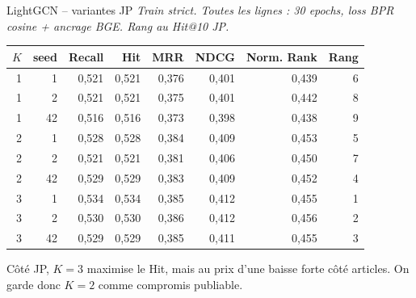 \documentclass[aspectratio=169,10pt]{beamer}
\newcommand{\keybox}[1]{%
  \begin{center}
  \colorbox{accentsoft}{\parbox{0.92\linewidth}{\centering #1}}
  \end{center}}
\begin{document}
\begin{frame}{LightGCN -- variantes JP}
  \scriptsize
  \textit{Train strict. Toutes les lignes : 30 epochs, loss BPR cosine + ancrage BGE. Rang au Hit@10 JP.}

  \vspace{0.25em}
  \begin{center}
  \renewcommand{\arraystretch}{1.08}
  \setlength{\tabcolsep}{4pt}
  \begin{tabular}{@{}r r r r r r r r@{}}
    \toprule
    $K$ & seed & Recall & Hit & MRR & NDCG & Norm. Rank & Rang \\
    \midrule
    1 & 1 & 0,521 & 0,521 & 0,376 & 0,401 & 0,439 & 6 \\
    1 & 2 & 0,521 & 0,521 & 0,375 & 0,401 & 0,442 & 8 \\
    1 & 42 & 0,516 & 0,516 & 0,373 & 0,398 & 0,438 & 9 \\
    2 & 1 & 0,528 & 0,528 & 0,384 & 0,409 & 0,453 & 5 \\
    2 & 2 & 0,521 & 0,521 & 0,381 & 0,406 & 0,450 & 7 \\
    \rowcolor{green!10}
    2 & 42 & 0,529 & 0,529 & 0,383 & 0,409 & 0,452 & 4 \\
    3 & 1 & 0,534 & 0,534 & 0,385 & 0,412 & 0,455 & 1 \\
    3 & 2 & 0,530 & 0,530 & 0,386 & 0,412 & 0,456 & 2 \\
    3 & 42 & 0,529 & 0,529 & 0,385 & 0,411 & 0,455 & 3 \\
    \bottomrule
  \end{tabular}
  \end{center}

  \vspace{0.4em}
  \keybox{\scriptsize Côté JP, $K=3$ maximise le Hit, mais au prix d'une baisse
  forte côté articles. On garde donc $K=2$ comme compromis publiable.}
\end{frame}
\end{document}
